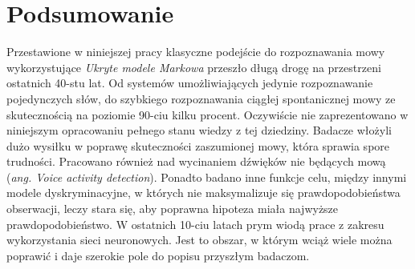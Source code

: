 \documentclass[a4paper,11pt,onecolumn,twoside,openright,titlepage]{article}
\begin{document}
	\section{Podsumowanie}
	Przestawione w niniejszej pracy klasyczne podejście do rozpoznawania mowy wykorzystujące \textit{Ukryte modele Markowa} przeszło długą drogę na przestrzeni ostatnich 40-stu lat. Od systemów umożliwiających jedynie rozpoznawanie pojedynczych słów, do szybkiego rozpoznawania ciągłej spontanicznej mowy ze skutecznością na poziomie 90-ciu kilku procent. Oczywiście nie zaprezentowano w niniejszym opracowaniu pełnego stanu wiedzy z tej dziedziny. Badacze włożyli dużo wysiłku w poprawę skuteczności zaszumionej mowy, która sprawia spore trudności. Pracowano również nad wycinaniem dźwięków nie będących mową (\textit{ang. Voice activity detection}). Ponadto badano inne funkcje celu, między innymi modele dyskryminacyjne, w których nie maksymalizuje się prawdopodobieństwa obserwacji, leczy stara się, aby poprawna hipoteza miała najwyższe prawdopodobieństwo. W ostatnich 10-ciu latach prym wiodą prace z zakresu wykorzystania sieci neuronowych. Jest to obszar, w którym wciąż wiele można poprawić i daje szerokie pole do popisu przyszłym badaczom.

	
	
\end{document}
